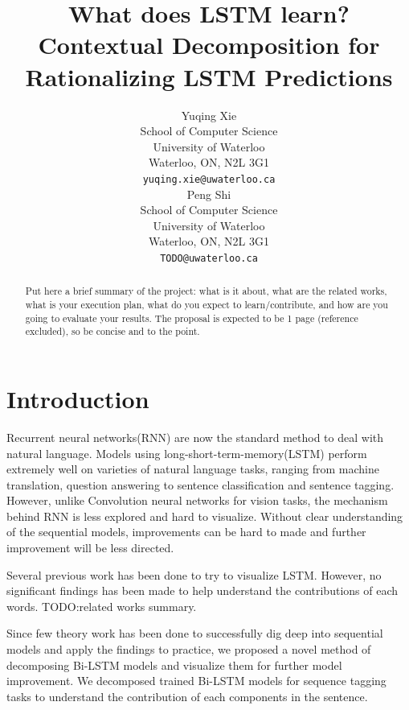 \documentclass{article}
\title{What does LSTM learn? Contextual Decomposition for Rationalizing LSTM Predictions}
\author{
	Yuqing Xie \\
	School of Computer Science\\
	University of Waterloo\\
	Waterloo, ON, N2L 3G1 \\
	\texttt{yuqing.xie@uwaterloo.ca} \\
	\And
	Peng Shi\\
	School of Computer Science\\
	University of Waterloo\\
	Waterloo, ON, N2L 3G1 \\
	\texttt{TODO@uwaterloo.ca} \\
}
\begin{document}
\maketitle

\begin{abstract}

Put here a brief summary of the project: what is it about, what are the related works, what is your execution plan, what do you expect to learn/contribute, and how are you going to evaluate your results. The proposal is expected to be 1 page (reference excluded), so be concise and to the point. 

\end{abstract}

\section{Introduction}

Recurrent neural networks(RNN) are now the standard method to deal with natural language. Models using long-short-term-memory(LSTM) perform extremely well on varieties of natural language tasks, ranging from machine translation, question answering to sentence classification and sentence tagging. However, unlike Convolution neural networks for vision tasks, the mechanism behind RNN is less explored and hard to visualize. Without clear understanding of the sequential models, improvements can be hard to made and further improvement will be less directed. 

Several previous work has been done to try to visualize LSTM. However, no significant findings has been made to help understand the contributions of each words. 
TODO:related works summary.

Since few theory work has been done to successfully dig deep into sequential models and apply the findings to practice, we proposed a novel method of decomposing Bi-LSTM models and visualize them for further model improvement. We decomposed trained Bi-LSTM models for sequence tagging tasks to understand the contribution of each components in the sentence. %
\end{document}
